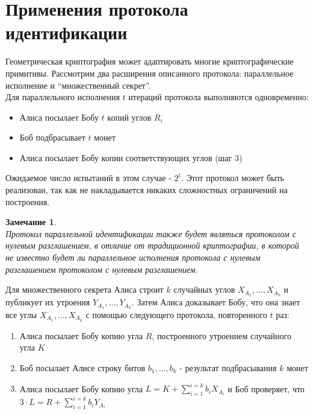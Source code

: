 \documentclass{report}%
\newtheorem{remark}{Замечание}
\begin{document}
\section{Применения протокола идентификации}

Геометрическая криптография может адаптировать многие криптографические примитивы.
Рассмотрим два расширения описанного протокола: параллельное исполнение и ``множественный секрет''.~\\

\noindent Для параллельного исполнения $t$ итераций протокола выполняются одновременно:
\begin{itemize}
	\item Алиса посылает Бобу $t$ копий углов $R_i$
	\item Боб подбрасывает $t$ монет
	\item Алиса посылает Бобу копии соответствующих углов (шаг 3)
\end{itemize}

\noindent Ожидаемое число испытаний в этом случае - $2^{t}$.
Этот протокол может быть реализован, так как не накладывается никаких сложностных ограничений на построения.

\begin{remark}~\\
	Протокол параллельной идентификации также будет являться протоколом с
	нулевым разглашением, в отличие от традиционной криптографии, в которой
	не известно будет ли параллельное исполнения протокола с нулевым разглашением
	протоколом с нулевым разглашением.
\end{remark}

\noindent Для множественного секрета Алиса строит $k$ случайных углов $X_{A_1}, \ldots, X_{A_k}$
и публикует их утроения $Y_{A_1}, \ldots, Y_{A_k}$. Затем Алиса доказывает Бобу, что она
знает все углы $X_{A_1}, \ldots, X_{A_k}$ с помощью следующего протокола, повторенного $t$ раз:

\begin{enumerate}
	\item Алиса посылает Бобу копию угла $R$, построенного утроением случайного угла $K$
	\item Боб посылает Алисе строку битов $b_1, \ldots, b_k$ - результат подбрасывания $k$ монет
	\item Алиса посылает Бобу копию угла $L = K + \sum_{i = 1}^{i = k} b_i X_{A_i}$
		и Боб проверяет, что $3 \cdot L = R + \sum_{i = 1}^{i = k} b_i Y_{A_i}$
\end{enumerate}
\end{document}
